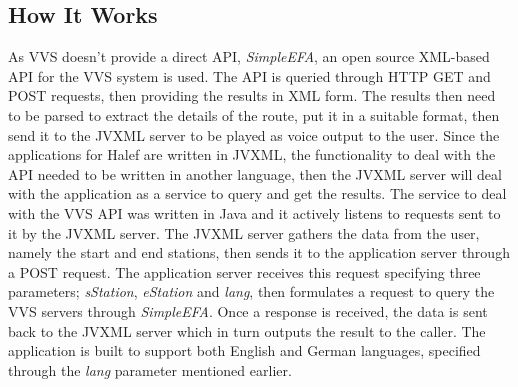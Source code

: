 \subsection{How It Works}
As VVS doesn't provide a direct API, \textit{SimpleEFA}, an open source XML-based API for the VVS system is used.
The API is queried through HTTP GET and POST requests, then providing the results in XML form.
The results then need to be parsed to extract the details of the route, put it in a suitable format, then send it to the JVXML server to be played as voice output to the user.
Since the applications for Halef are written in JVXML, the functionality to deal with the API needed to be written in another language, then the JVXML server will deal with the application as a service to query and get the results.
The service to deal with the VVS API was written in Java and it actively listens to requests sent to it by the JVXML server.
The JVXML server gathers the data from the user, namely the start and end stations, then sends it to the application server through a POST request.
The application server receives this request specifying three parameters; \textit{sStation}, \textit{eStation} and \textit{lang}, then formulates a request to query the VVS servers through \textit{SimpleEFA}.
Once a response is received, the data is sent back to the JVXML server which in turn outputs the result to the caller.
The application is built to support both English and German languages, specified through the \textit{lang} parameter mentioned earlier.
